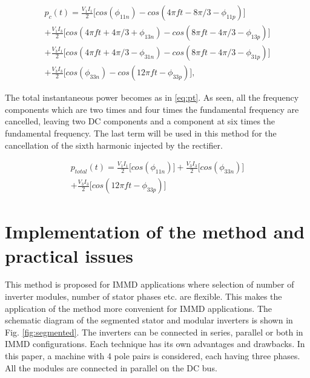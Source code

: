 \documentclass[conference,a4paper,twocolumn]{IEEEtran}
\begin{document}
\begin{equation}
\label{eq:pc}
\begin{multlined}
p_c(t) = 
\frac{V_1I_1}{2} \bigg \lbrack cos(\phi_{11n})-cos(4\pi ft-8\pi/3-\phi_{11p}) \bigg \rbrack
\\
+
\frac{V_1I_3}{2} \bigg \lbrack cos(4\pi ft+ 4\pi/3+\phi_{13n})-cos(8\pi ft-4\pi/3-\phi_{13p}) \bigg \rbrack
\\
+
\frac{V_3I_1}{2} \bigg \lbrack cos(4\pi ft+4\pi/3-\phi_{31n})-cos(8\pi ft-4\pi/3-\phi_{31p}) \bigg \rbrack
\\
+
\frac{V_3I_3}{2} \bigg \lbrack cos(\phi_{33n})-cos(12\pi ft-\phi_{33p}) \bigg \rbrack,
\end{multlined}
\end{equation}

The total instantaneous power becomes as in \ref{eq:pt}. As seen, all the frequency components which are two times and four times the fundamental frequency are cancelled, leaving two DC components and a component at six times the fundamental frequency. The last term will be used in this method for the cancellation of the sixth harmonic injected by the rectifier.

\begin{equation}
\label{eq:pt}
\begin{multlined}
p_{total}(t) = 
\frac{V_1I_1}{2} \bigg \lbrack cos(\phi_{11n}) \bigg \rbrack
+
\frac{V_3I_3}{2} \bigg \lbrack cos(\phi_{33n}) \bigg \rbrack
\\
+
\frac{V_3I_3}{2} \bigg \lbrack cos(12\pi ft-\phi_{33p}) \bigg \rbrack
\end{multlined}
\end{equation}




\section{Implementation of the method and practical issues}

This method is proposed for IMMD applications where selection of number of inverter modules, number of stator phases etc. are flexible. This makes the application of the method more convenient for IMMD applications. The schematic diagram of the segmented stator and modular inverters is shown in Fig. \ref{fig:segmented}. The inverters can be connected in series, parallel or both in IMMD configurations. Each technique has its own advantages and drawbacks. In this paper, a machine with 4 pole pairs is considered, each having three phases. All the modules are connected in parallel on the DC bus.
\end{document}
